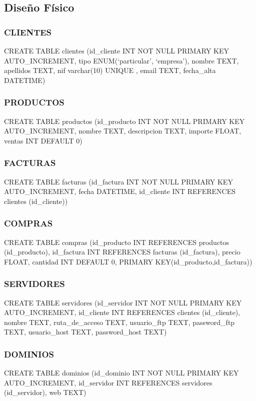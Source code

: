 \documentclass[paper=a4, fontsize=11pt, spanish]{scrartcl}
\begin{document}
\subsection{Diseño Físico}
\subsubsection{CLIENTES}
CREATE TABLE clientes (id\_cliente INT NOT NULL PRIMARY KEY AUTO\_INCREMENT, tipo ENUM(‘particular’, ‘empresa’),  nombre TEXT,  apellidos TEXT, nif varchar(10) UNIQUE , email TEXT, fecha\_alta DATETIME)

\subsubsection{PRODUCTOS}
CREATE TABLE productos (id\_producto INT NOT NULL PRIMARY KEY AUTO\_INCREMENT, nombre TEXT,  descripcion TEXT,  importe FLOAT, ventas INT DEFAULT 0)

\subsubsection{FACTURAS}
CREATE TABLE facturas (id\_factura INT NOT NULL PRIMARY KEY AUTO\_INCREMENT, fecha DATETIME, id\_cliente INT REFERENCES clientes (id\_cliente))

\subsubsection{COMPRAS}
CREATE TABLE compras (id\_producto INT REFERENCES productos (id\_producto), id\_factura INT REFERENCES facturas (id\_factura), precio FLOAT, cantidad INT DEFAULT 0, PRIMARY KEY(id\_producto,id\_factura))

\subsubsection{SERVIDORES}
CREATE TABLE servidores (id\_servidor INT NOT NULL PRIMARY KEY AUTO\_INCREMENT, id\_cliente INT REFERENCES clientes (id\_cliente), nombre TEXT,  ruta\_de\_acceso TEXT, usuario\_ftp TEXT, password\_ftp TEXT, usuario\_host TEXT, password\_host TEXT)

\subsubsection{DOMINIOS}
CREATE TABLE dominios (id\_dominio INT NOT NULL PRIMARY KEY AUTO\_INCREMENT, id\_servidor INT REFERENCES servidores (id\_servidor), web TEXT)
\end{document}

